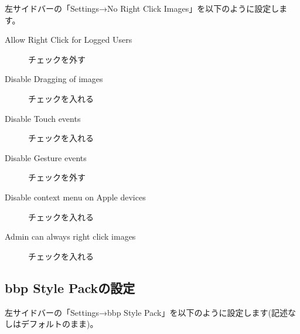 \documentclass[titlepage,10pt,a4paper,uplatex]{jsbook}
\begin{document}
左サイドバーの「Settings→No Right Click Images」を以下のように設定します。

\begin{description}
\item[Allow Right Click for Logged Users] チェックを外す
\item[Disable Dragging of images] チェックを入れる
\item[Disable Touch events] チェックを入れる
\item[Disable Gesture events] チェックを外す
\item[Disable context menu on Apple devices] チェックを入れる
\item[Admin can always right click images] チェックを入れる
\end{description}

\subsection{bbp Style Packの設定}

左サイドバーの「Settings→bbp Style Pack」を以下のように設定します(記述なしはデフォルトのまま)。
\end{document}
